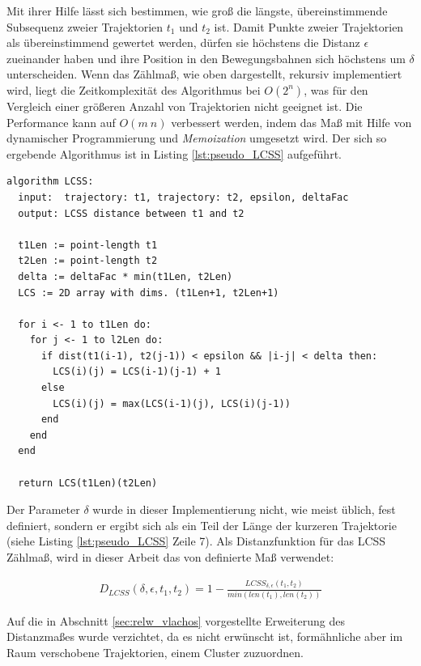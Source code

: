 Mit ihrer Hilfe lässt sich bestimmen, wie groß die längste, übereinstimmende Subsequenz zweier Trajektorien
$t_1$ und $t_2$ ist. Damit Punkte zweier Trajektorien als übereinstimmend gewertet werden, dürfen sie
höchstens die Distanz $\epsilon$ zueinander haben und ihre Position in den Bewegungsbahnen sich höchstens um $\delta$
unterscheiden.
Wenn das Zählmaß, wie oben dargestellt, rekursiv implementiert wird, liegt die Zeitkomplexität des Algorithmus
bei $O(2^n)$, was für den Vergleich einer größeren Anzahl von Trajektorien nicht geeignet ist. Die Performance
kann auf $O(m\ n)$ verbessert werden, indem das Maß mit Hilfe von dynamischer Programmierung und \textit{Memoization}
umgesetzt wird. Der sich so ergebende Algorithmus ist in Listing \ref{lst:pseudo_LCSS} aufgeführt.
\begin{lstlisting}[caption=Pseudocode LCSS Bestimmung, language=Pseudo, label=lst:pseudo_LCSS]
algorithm LCSS:
  input:  trajectory: t1, trajectory: t2, epsilon, deltaFac
  output: LCSS distance between t1 and t2

  t1Len := point-length t1
  t2Len := point-length t2
  delta := deltaFac * min(t1Len, t2Len)
  LCS := 2D array with dims. (t1Len+1, t2Len+1)

  for i <- 1 to t1Len do:
    for j <- 1 to l2Len do:
      if dist(t1(i-1), t2(j-1)) < epsilon && |i-j| < delta then:
        LCS(i)(j) = LCS(i-1)(j-1) + 1
      else
        LCS(i)(j) = max(LCS(i-1)(j), LCS(i)(j-1))
      end
    end
  end

  return LCS(t1Len)(t2Len)
\end{lstlisting}

Der Parameter $\delta$ wurde in dieser Implementierung nicht, wie meist üblich, fest definiert, sondern er ergibt sich als
ein Teil der Länge der kurzeren Trajektorie (siehe Listing \ref{lst:pseudo_LCSS} Zeile 7).
Als Distanzfunktion für das LCSS Zählmaß, wird in dieser Arbeit das von \cite[]{Vlachos2002} definierte
Maß verwendet:

\begin{ceqn}
\begin{align*}
    D_{LCSS}(\delta, \epsilon, t_1, t_2) = 1 - \frac{LCSS_{\delta, \epsilon}(t_1, t_2)}{min(len(t_1), len(t_2))}
\end{align*}
\end{ceqn}

Auf die in Abschnitt \ref{sec:relw_vlachos} vorgestellte Erweiterung des Distanzmaßes wurde verzichtet,
da es nicht erwünscht ist, formähnliche aber im Raum verschobene Trajektorien, einem Cluster zuzuordnen.

